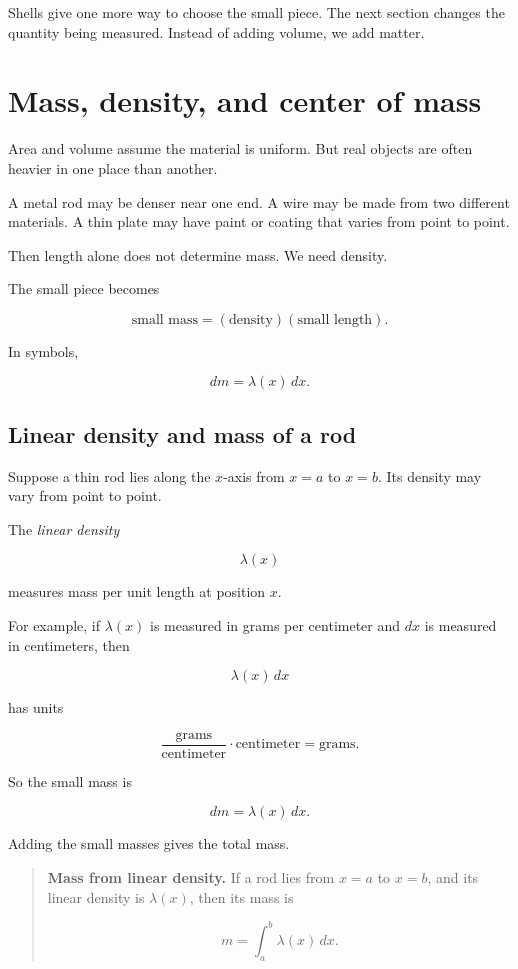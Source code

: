 Shells give one more way to choose the small piece.  The next section changes the
quantity being measured.  Instead of adding volume, we add matter.

\section{Mass, density, and center of mass}
\label{sec:mass-density-center-of-mass}

Area and volume assume the material is uniform.  But real objects are often heavier
in one place than another.

A metal rod may be denser near one end.  A wire may be made from two different
materials.  A thin plate may have paint or coating that varies from point to point.

Then length alone does not determine mass.  We need density.

The small piece becomes

\[
\text{small mass}=(\text{density})(\text{small length}).
\]

In symbols,

\[
dm=\lambda(x)\,dx.
\]

\subsection{Linear density and mass of a rod}
\label{subsec:linear-density-mass-rod}

Suppose a thin rod lies along the \(x\)-axis from \(x=a\) to \(x=b\).  Its density may
vary from point to point.

The \emph{linear density}

\[
\lambda(x)
\]

measures mass per unit length at position \(x\).

For example, if \(\lambda(x)\) is measured in grams per centimeter and \(dx\) is
measured in centimeters, then

\[
\lambda(x)\,dx
\]

has units

\[
\frac{\text{grams}}{\text{centimeter}}\cdot\text{centimeter}
=
\text{grams}.
\]

So the small mass is

\[
dm=\lambda(x)\,dx.
\]

Adding the small masses gives the total mass.

\begin{quote}
\textbf{Mass from linear density.}
If a rod lies from \(x=a\) to \(x=b\), and its linear density is \(\lambda(x)\), then its
mass is

\[
\boxed{
m=\int_a^b \lambda(x)\,dx.
}
\]
\end{quote}

